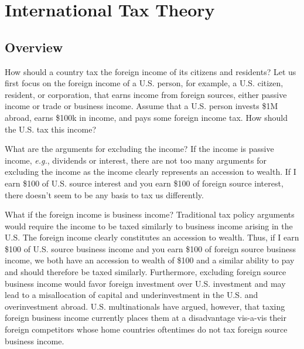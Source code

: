 \chapter{International Tax Theory}
\section{Overview}
How should a country tax the foreign income of its citizens and residents?  Let us first focus on the foreign income of a U.S. person, for example, a U.S. citizen, resident, or corporation, that earns income from foreign sources, either passive income or trade or business income.  Assume that a U.S. person invests \$1M abroad, earns \$100k in income, and pays some foreign income tax.  How should the U.S. tax this income?    

What are the arguments for excluding the income?  If the income is passive income, \emph{e.g.}, dividends or interest, there are not too many arguments for excluding the income as the income clearly represents an accession to wealth.  If I earn \$100 of U.S. source interest and you earn \$100 of foreign source interest, there doesn't seem to be any basis to tax us differently.  

What if the foreign income is business income?  Traditional tax policy arguments would require the income to be taxed similarly to business income arising in the U.S.  The foreign income clearly constitutes an accession to wealth.  Thus, if I earn \$100 of U.S. source business income and you earn \$100 of foreign source business income, we both have an accession to wealth of \$100 and a similar ability to pay and should therefore be taxed similarly.  Furthermore, excluding foreign source business income would favor foreign investment over U.S. investment and may lead to a misallocation of capital and underinvestment in the U.S. and overinvestment abroad.  U.S. multinationals have argued, however, that taxing foreign business income currently places them at a disadvantage vis-a-vis their foreign competitors whose home countries oftentimes do not tax foreign source business income.  

